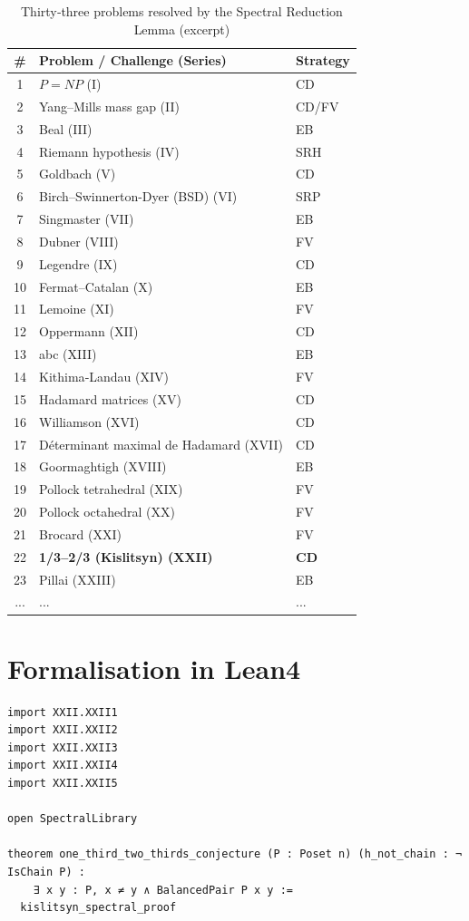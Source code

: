\documentclass[11pt,a4paper]{article}
\begin{document}
\begin{center}
\small
\begin{longtable}{@{}cll@{}}
\caption{Thirty‑three problems resolved by the Spectral Reduction Lemma (excerpt)}\\
\toprule
\# & Problem / Challenge (Series) & Strategy \\
\midrule
1 & \(P = NP\) (I) & CD \\
2 & Yang–Mills mass gap (II) & CD/FV \\
3 & Beal (III) & EB \\
4 & Riemann hypothesis (IV) & SRH \\
5 & Goldbach (V) & CD \\
6 & Birch–Swinnerton-Dyer (BSD) (VI) & SRP \\
7 & Singmaster (VII) & EB \\
8 & Dubner (VIII) & FV \\
9 & Legendre (IX) & CD \\
10 & Fermat–Catalan (X) & EB \\
11 & Lemoine (XI) & FV \\
12 & Oppermann (XII) & CD \\
13 & abc (XIII) & EB \\
14 & Kithima‑Landau (XIV) & FV \\
15 & Hadamard matrices (XV) & CD \\
16 & Williamson (XVI) & CD \\
17 & Déterminant maximal de Hadamard (XVII) & CD \\
18 & Goormaghtigh (XVIII) & EB \\
19 & Pollock tetrahedral (XIX) & FV \\
20 & Pollock octahedral (XX) & FV \\
21 & Brocard (XXI) & FV \\
22 & \textbf{1/3–2/3 (Kislitsyn) (XXII)} & \textbf{CD} \\
23 & Pillai (XXIII) & EB \\
... & ... & ... \\
\bottomrule
\end{longtable}
\end{center}

\section{Formalisation in Lean4}

\begin{lstlisting}[style=lean, caption={MainXXII.lean (final)}]
import XXII.XXII1
import XXII.XXII2
import XXII.XXII3
import XXII.XXII4
import XXII.XXII5

open SpectralLibrary

theorem one_third_two_thirds_conjecture (P : Poset n) (h_not_chain : ¬ IsChain P) :
    ∃ x y : P, x ≠ y ∧ BalancedPair P x y :=
  kislitsyn_spectral_proof
\end{lstlisting}
\end{document}
